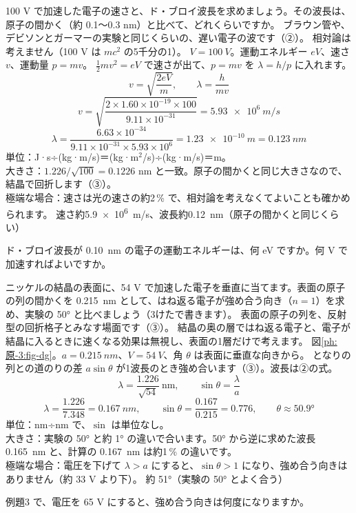 \label{ph:原-3:ex2}
\begin{phreidai}[100 V の電子の波長]
100 V で加速した電子の速さと、ド・ブロイ波長を求めましょう。その波長は、原子の間かく（約 0.1〜0.3 nm）と比べて、どれくらいですか。
\phbamen
ブラウン管や、デビソンとガーマーの実験と同じくらいの、遅い電子の波です（②）。
\phmushi
相対論は考えません（100 V は $mc^2$ の5千分の1）。
\phzu
$V=\qty{100}{V}$。運動エネルギー $eV$、速さ $v$、運動量 $p=mv$。
\phriyu
$\tfrac12mv^2=eV$ で速さが出て、$p=mv$ を $\lambda=h/p$ に入れます。
\phtateru
\[ v=\sqrt{\frac{2eV}{m}},\qquad \lambda=\frac{h}{mv} \]
\phtoku
\[ v=\sqrt{\frac{2\times1.60\times10^{-19}\times100}{9.11\times10^{-31}}}=\qty{5.93e6}{m/s} \]
\[ \lambda=\frac{6.63\times10^{-34}}{9.11\times10^{-31}\times5.93\times10^{6}}=\qty{1.23e-10}{m}=\qty{0.123}{nm} \]
\phtashikame
単位：J·s÷(kg·m/s)＝(kg·m$^2$/s)÷(kg·m/s)＝m。\\
大きさ：$1.226/\sqrt{100}=0.1226$ nm と一致。原子の間かくと同じ大きさなので、結晶で回折します（③）。\\
極端な場合：速さは光の速さの約2\,\% で、相対論を考えなくてよいことも確かめられます。
\kotae 速さ約\qty{5.9e6}{m/s}、波長約\qty{0.12}{nm}（原子の間かくと同じくらい）
\end{phreidai}
\begin{jibun}
ド・ブロイ波長が \qty{0.10}{nm} の電子の運動エネルギーは、何 eV ですか。何 V で加速すればよいですか。
\end{jibun}

\label{ph:原-3:ex3}
\begin{phreidai}[デビソンとガーマーの実験]
ニッケルの結晶の表面に、54 V で加速した電子を垂直に当てます。表面の原子の列の間かくを \qty{0.215}{nm} として、はね返る電子が強め合う向き（$n=1$）を求め、実験の 50° と比べましょう（3けたで書きます）。
\phbamen
表面の原子の列を、反射型の回折格子とみなす場面です（③）。
\phmushi
結晶の奥の層ではね返る電子と、電子が結晶に入るときに速くなる効果は無視し、表面の1層だけで考えます。
\phzu
図\ref{ph:原-3:fig-dg}。$a=\qty{0.215}{nm}$、$V=\qty{54}{V}$、角 $\theta$ は表面に垂直な向きから。
\phriyu
となりの列との道のりの差 $a\sin\theta$ が1波長のとき強め合います（③）。波長は②の式。
\phtateru
\[ \lambda=\frac{1.226}{\sqrt{54}}\ \mathrm{nm},\qquad \sin\theta=\frac{\lambda}{a} \]
\phtoku
\[ \lambda=\frac{1.226}{7.348}=\qty{0.167}{nm},\qquad \sin\theta=\frac{0.167}{0.215}=0.776,\qquad\theta\approx\ang{50.9} \]
\phtashikame
単位：nm÷nm で、$\sin$ は単位なし。\\
大きさ：実験の 50° と約 1° の違いで合います。50° から逆に求めた波長 \qty{0.165}{nm} と、計算の \qty{0.167}{nm} は約1\,\% の違いです。\\
極端な場合：電圧を下げて $\lambda>a$ にすると、$\sin\theta>1$ になり、強め合う向きはありません（約 33 V より下）。
\kotae 約 51°（実験の 50° とよく合う）
\end{phreidai}
\begin{jibun}
例題3 で、電圧を 65 V にすると、強め合う向きは何度になりますか。
\end{jibun}

